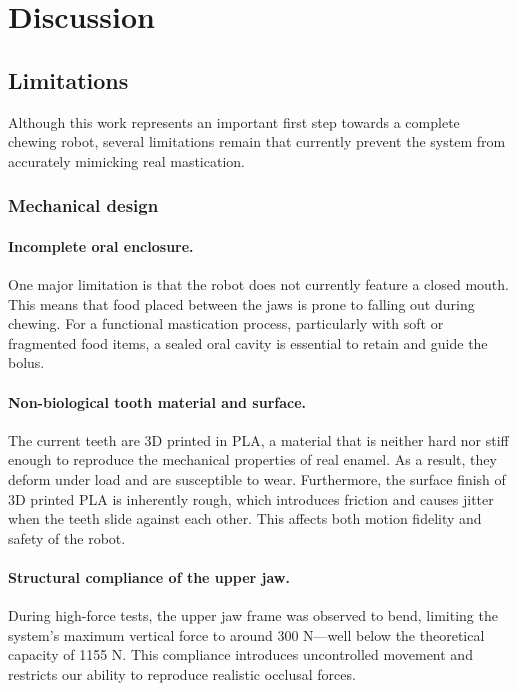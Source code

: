 \section{Discussion}

\subsection{Limitations}

Although this work represents an important first step towards a complete chewing robot, several limitations remain that currently prevent the system from 
accurately mimicking real mastication.

\subsubsection{Mechanical design}
\paragraph{Incomplete oral enclosure.}
One major limitation is that the robot does not currently feature a closed mouth. This means that food placed between the jaws is prone to falling out during 
chewing. For a functional mastication process, particularly with soft or fragmented food items, a sealed oral cavity is essential to retain and guide the bolus.

\paragraph{Non-biological tooth material and surface.}
The current teeth are 3D printed in PLA, a material that is neither hard nor stiff enough to reproduce the mechanical properties of real enamel. As a result, 
they deform under load and are susceptible to wear. Furthermore, the surface finish of 3D printed PLA is inherently rough, which introduces friction and causes 
jitter when the teeth slide against each other. This affects both motion fidelity and safety of the robot.

\paragraph{Structural compliance of the upper jaw.}
During high-force tests, the upper jaw frame was observed to bend, limiting the system's maximum vertical force to around 300 N—well below the theoretical 
capacity of 1155 N. This compliance introduces uncontrolled movement and restricts our ability to reproduce realistic occlusal forces.

